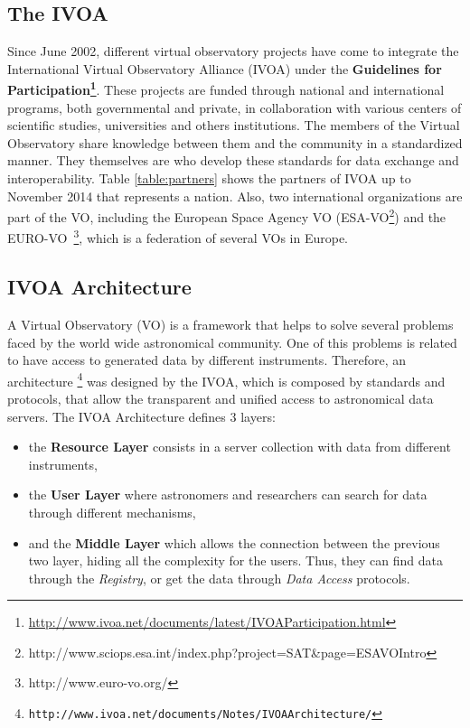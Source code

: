 \normalsize

\subsection{The IVOA}

Since June 2002, different virtual observatory projects have come to integrate the
International Virtual Observatory Alliance (IVOA) under the \textbf{Guidelines
for Participation\footnote{\url{http://www.ivoa.net/documents/latest/IVOAParticipation.html}}}. 
These projects are funded through national and international programs, both governmental and 
private, in collaboration with various centers of scientific studies, universities and
others institutions. The members of the Virtual Observatory share
knowledge between them and the community in a standardized manner. They
themselves are who develop these standards for data exchange and
interoperability.
Table \ref{table:partners} shows the partners of IVOA up to
November 2014 that represents a nation. Also, two international organizations
are part of the VO, including the European Space Agency VO
(ESA-VO\footnote{http://www.sciops.esa.int/index.php?project=SAT\&page=ESAVOIntro})
and the EURO-VO~\footnote{http://www.euro-vo.org/}, which is a federation of several VOs in Europe.

\subsection{IVOA Architecture}

A Virtual Observatory (VO) is a framework that helps to solve several
problems faced by the world wide astronomical community.
One of this problems is related to have access to generated data by
different instruments. Therefore, an architecture
\footnote{\texttt{http://www.ivoa.net/documents/Notes/IVOAArchitecture/}} was designed by the IVOA, which is composed by
standards and protocols, that allow the transparent
and unified access to astronomical data servers. The IVOA Architecture
defines 3 layers:
\begin{itemize}
        \item the \textbf{Resource Layer} consists in a server
collection with data from different instruments,
        \item the \textbf{User Layer} where astronomers and researchers can
search for data through different mechanisms,
        \item and the \textbf{Middle Layer} which allows the connection
between the previous two layer, hiding all the complexity for the
users. Thus, they can find data through the \emph{Registry}, or get the data
through \emph{Data Access} protocols.
\end{itemize}

